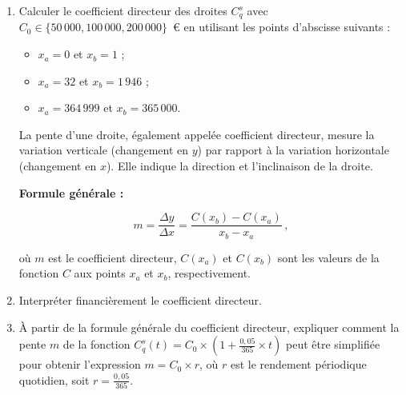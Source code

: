 \documentclass{article}
\begin{document}
\begin{enumerate}[label=\textbf{Q1.\arabic*}]
                \item Calculer le coefficient directeur des droites \( C^s_q \) avec \( C_0 \in \{50\,000, 100\,000, 200\,000\} \)~€ en utilisant les points d'abscisse suivants :
                \begin{itemize}
                    \item \( x_a = 0 \) et \( x_b = 1 \) ;
                    \item \( x_a = 32 \) et \( x_b = 1\,946 \) ;
                    \item \( x_a = 364\,999 \) et \( x_b = 365\,000 \).
                \end{itemize}
                \begin{tcolorbox}[
                    colback=lightgreen,
                    colframe=lightgreen,
                    boxrule=0.5pt,
                    arc=0pt,
                    left=10pt,
                    right=10pt,
                    top=6pt,
                    bottom=6pt,
                    boxsep=2pt,
                    before upper={\faLightbulb\hspace{10pt}}
                ]
                    La pente d'une droite, également appelée coefficient directeur, mesure la variation verticale (changement en \( y \)) par rapport à la variation horizontale (changement en \( x \)). Elle indique la direction et l'inclinaison de la droite.

                    \textbf{Formule générale :}

                    \[
                    m = \frac{\Delta y}{\Delta x} = \frac{C(x_b) - C(x_a)}{x_b - x_a}\,,
                    \]

                    où \( m \) est le coefficient directeur, \( C(x_a) \) et \( C(x_b) \) sont les valeurs de la fonction \( C \) aux points \( x_a \) et \( x_b \), respectivement.
                \end{tcolorbox}

                \item Interpréter financièrement le coefficient directeur.

                \item À partir de la formule générale du coefficient directeur, expliquer comment la pente \( m \) de la fonction \( C_q^s(t) = C_0 \times \left(1 + \frac{0{,}05}{365} \times t\right) \) peut être simplifiée pour obtenir l'expression \( m = C_0 \times r \), où \( r \) est le rendement périodique quotidien, soit \( r = \frac{0{,}05}{365} \).


\end{enumerate}
\end{document}
